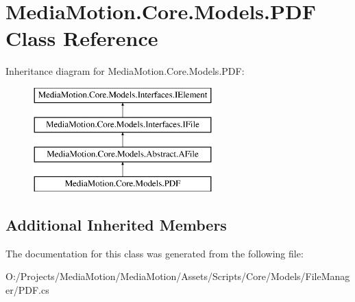 \hypertarget{class_media_motion_1_1_core_1_1_models_1_1_p_d_f}{\section{Media\+Motion.\+Core.\+Models.\+P\+D\+F Class Reference}
\label{class_media_motion_1_1_core_1_1_models_1_1_p_d_f}
}
Inheritance diagram for Media\+Motion.\+Core.\+Models.\+P\+D\+F\+:\begin{figure}[H]
\begin{center}
\leavevmode
\includegraphics[height=4.000000cm]{class_media_motion_1_1_core_1_1_models_1_1_p_d_f}
\end{center}
\end{figure}
\subsection*{Additional Inherited Members}


The documentation for this class was generated from the following file\+:\begin{DoxyCompactItemize}
\item 
O\+:/\+Projects/\+Media\+Motion/\+Media\+Motion/\+Assets/\+Scripts/\+Core/\+Models/\+File\+Manager/P\+D\+F.\+cs\end{DoxyCompactItemize}

